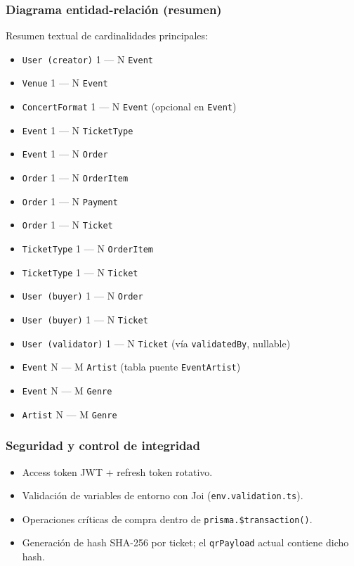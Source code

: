 \documentclass[
  11pt,
  a4paper,
  twoside=false,
  parskip=half               %
]{scrreprt}                  %
\providecommand{\tightlist}{%
  \setlength{\itemsep}{0pt}\setlength{\parskip}{0pt}}
\begin{document}
\hypertarget{diagrama-entidad-relaciuxf3n-resumen}{%
\subsubsection{Diagrama entidad-relación
(resumen)}\label{diagrama-entidad-relaciuxf3n-resumen}}

Resumen textual de cardinalidades principales:

\begin{itemize}
\tightlist
\item
  \texttt{User\ (creator)} 1 --- N \texttt{Event}
\item
  \texttt{Venue} 1 --- N \texttt{Event}
\item
  \texttt{ConcertFormat} 1 --- N \texttt{Event} (opcional en
  \texttt{Event})
\item
  \texttt{Event} 1 --- N \texttt{TicketType}
\item
  \texttt{Event} 1 --- N \texttt{Order}
\item
  \texttt{Order} 1 --- N \texttt{OrderItem}
\item
  \texttt{Order} 1 --- N \texttt{Payment}
\item
  \texttt{Order} 1 --- N \texttt{Ticket}
\item
  \texttt{TicketType} 1 --- N \texttt{OrderItem}
\item
  \texttt{TicketType} 1 --- N \texttt{Ticket}
\item
  \texttt{User\ (buyer)} 1 --- N \texttt{Order}
\item
  \texttt{User\ (buyer)} 1 --- N \texttt{Ticket}
\item
  \texttt{User\ (validator)} 1 --- N \texttt{Ticket} (vía
  \texttt{validatedBy}, nullable)
\item
  \texttt{Event} N --- M \texttt{Artist} (tabla puente
  \texttt{EventArtist})
\item
  \texttt{Event} N --- M \texttt{Genre}
\item
  \texttt{Artist} N --- M \texttt{Genre}
\end{itemize}

\hypertarget{seguridad-y-control-de-integridad}{%
\subsubsection{Seguridad y control de
integridad}\label{seguridad-y-control-de-integridad}}

\begin{itemize}
\tightlist
\item
  Access token JWT + refresh token rotativo.
\item
  Validación de variables de entorno con Joi
  (\texttt{env.validation.ts}).
\item
  Operaciones críticas de compra dentro de
  \texttt{prisma.\$transaction()}.
\item
  Generación de hash SHA-256 por ticket; el \texttt{qrPayload} actual
  contiene dicho hash.
\end{itemize}
\end{document}

